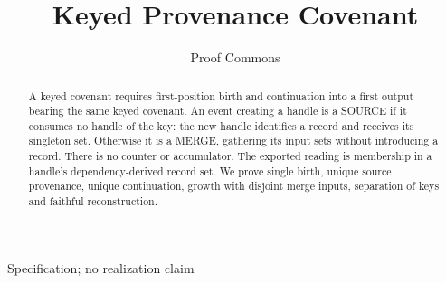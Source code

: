\documentclass[../main.tex]{subfiles}
\begin{document}
\title{Keyed Provenance Covenant}
\author{Proof Commons \\ \docversion}
\date{\LineageDate}
\maketitle
\begin{center}
Specification; no realization claim
\end{center}

\begin{abstract}
\label{abst:kpc:abstract}
A keyed covenant requires first-position birth and continuation into a
first output bearing the same keyed covenant. An event creating a handle
is a SOURCE if it consumes no handle of the key: the new handle identifies a record and receives its
singleton set. Otherwise it is a MERGE, gathering its input sets without
introducing a record. There is no counter or accumulator. The exported
reading is membership in a handle's dependency-derived record set.
We prove single birth, unique source provenance, unique continuation,
growth with disjoint merge inputs, separation of keys and faithful
reconstruction.
\end{abstract}
\end{document}
